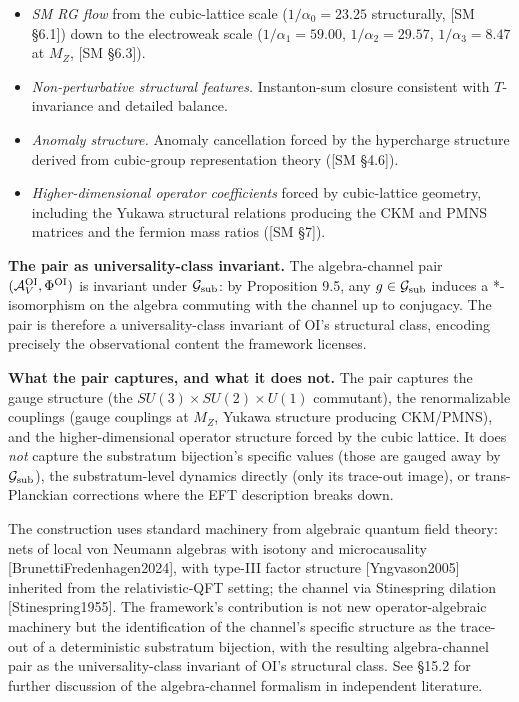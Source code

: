 \documentclass[
]{article}
\providecommand{\tightlist}{%
  \setlength{\itemsep}{0pt}\setlength{\parskip}{0pt}}
\begin{document}
\begin{itemize}
\tightlist
\item
  \emph{SM RG flow} from the cubic-lattice scale (\(1/\alpha_0 = 23.25\)
  structurally, {[}SM §6.1{]}) down to the electroweak scale
  (\(1/\alpha_1 = 59.00\), \(1/\alpha_2 = 29.57\), \(1/\alpha_3 = 8.47\)
  at \(M_Z\), {[}SM §6.3{]}).
\item
  \emph{Non-perturbative structural features.} Instanton-sum closure
  consistent with \(T\)-invariance and detailed balance.
\item
  \emph{Anomaly structure.} Anomaly cancellation forced by the
  hypercharge structure derived from cubic-group representation theory
  ({[}SM §4.6{]}).
\item
  \emph{Higher-dimensional operator coefficients} forced by
  cubic-lattice geometry, including the Yukawa structural relations
  producing the CKM and PMNS matrices and the fermion mass ratios ({[}SM
  §7{]}).
\end{itemize}

\textbf{The pair as universality-class invariant.} The algebra-channel
pair \((\mathcal{A}_V^{\rm OI}, \Phi^{\rm OI})\) is invariant under
\(\mathcal{G}_{\rm sub}\): by Proposition 9.5, any
\(g \in \mathcal{G}_{\rm sub}\) induces a *-isomorphism on the algebra
commuting with the channel up to conjugacy. The pair is therefore a
universality-class invariant of OI's structural class, encoding
precisely the observational content the framework licenses.

\textbf{What the pair captures, and what it does not.} The pair captures
the gauge structure (the \(SU(3) \times SU(2) \times U(1)\) commutant),
the renormalizable couplings (gauge couplings at \(M_Z\), Yukawa
structure producing CKM/PMNS), and the higher-dimensional operator
structure forced by the cubic lattice. It does \emph{not} capture the
substratum bijection's specific values (those are gauged away by
\(\mathcal{G}_{\rm sub}\)), the substratum-level dynamics directly (only
its trace-out image), or trans-Planckian corrections where the EFT
description breaks down.

The construction uses standard machinery from algebraic quantum field
theory: nets of local von Neumann algebras with isotony and
microcausality {[}BrunettiFredenhagen2024{]}, with type-III factor
structure {[}Yngvason2005{]} inherited from the relativistic-QFT
setting; the channel via Stinespring dilation {[}Stinespring1955{]}. The
framework's contribution is not new operator-algebraic machinery but the
identification of the channel's specific structure as the trace-out of a
deterministic substratum bijection, with the resulting algebra-channel
pair as the universality-class invariant of OI's structural class. See
§15.2 for further discussion of the algebra-channel formalism in
independent literature.
\end{document}
